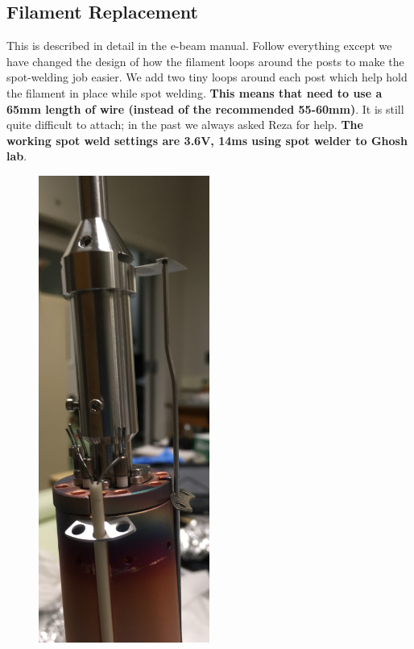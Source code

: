 \subsection{Filament Replacement}
This is described in detail in the e-beam manual. Follow everything except we have changed the design of how the filament loops around the posts to make the spot-welding job easier. We add two tiny loops around each post which help hold the filament in place while spot welding. \textbf{This means that need to use a 65mm length of wire (instead of the recommended 55-60mm)}. It is still quite difficult to attach; in the past we always asked Reza for help. \textbf{The working spot weld settings are 3.6V, 14ms using spot welder to Ghosh lab}.
\begin{figure}[H]
\begin{minipage}[b]{0.33\linewidth}
	\centering
	\includegraphics[width=0.5\textwidth]{partially_dissasembled.jpg}
\end{minipage}\hfill

\end{figure}
